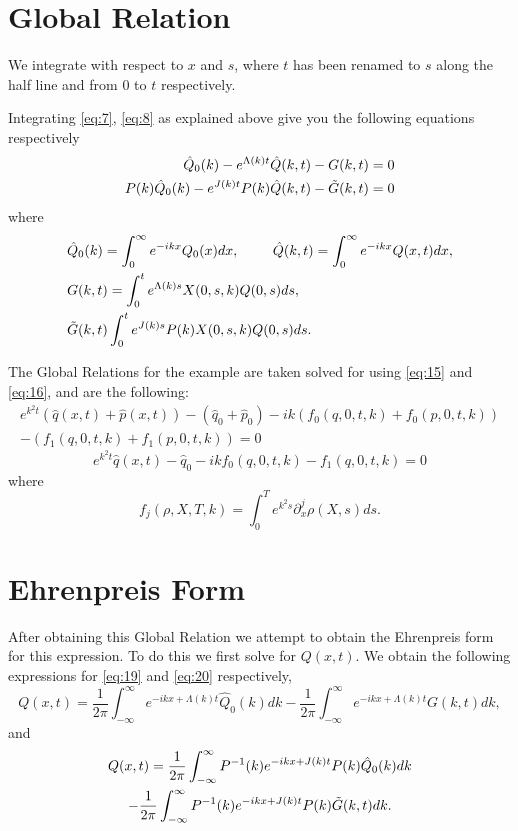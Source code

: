 \documentclass{article}
\begin{document}
\section{Global Relation}
    We integrate with respect to $x$ and $s$, where $t$ has been renamed to $s$ along the half line and from 0 to $t$ respectively.
    
    Integrating \eqref{eq:7}, \eqref{eq:8} as explained above give you the following equations respectively
    \begin{align}
        \hat{Q}_0(k) - e^{\Lambda(k)t}\hat{Q}(k,t) - G(k,t) &= 0 \label{eq:19} \\
        P(k)\hat{Q}_0(k) - e^{J(k)t}P(k)\hat{Q}(k,t) - \Tilde{G}(k,t) &= 0 \label{eq:20}
    \end{align}
where
\begin{align}
    &\hat{Q}_0(k) = \int_0^{\infty}e^{-ikx}Q_0(x)dx, 
    \hspace{2pc} \hat{Q}(k,t) = \int_0^{\infty}e^{-ikx}Q(x,t)dx, \label{eq:21}\\
    &G(k,t) = \int_0^t e^{\Lambda(k)s}X(0,s,k)Q(0,s)ds, \label{eq:22}\\ 
    &\Tilde{G}(k,t) \int_0^t e^{J(k)s}P(k)X(0,s,k)Q(0,s)ds. \label{eq:23}
\end{align}

The Global Relations for the example are taken solved for using \eqref{eq:15} and \eqref{eq:16}, and are the following:
\begin{multline} \label{eq:24}
   e^{k^2t}(\hat{q}(x,t) + \hat{p}(x,t)) - (\hat{q}_0 + \hat{p}_0) - ik(f_0(q,0,t,k) + f_0(p,0,t,k)) \\ - (f_1(q,0,t,k) + f_1(p,0,t,k)) = 0 
\end{multline}
\begin{equation} \label{eq:25}
    e^{k^2t}\hat{q}(x,t) - \hat{q}_0 - ikf_0(q,0,t,k) -f_1(q,0,t,k) = 0
\end{equation}
where
\begin{equation} \label{eq:26}
    f_j(\rho, X, T, k) = \int_0^T e^{k^2s} \partial^j_x\rho(X,s) ds. 
\end{equation}

\section{Ehrenpreis Form}
After obtaining this Global Relation we attempt to obtain the Ehrenpreis form for this expression. To do this we first solve for $Q(x,t)$. We obtain the following expressions for \eqref{eq:19} and \eqref{eq:20} respectively,
\begin{equation} \label{eq:27}
    Q(x,t) = \frac{1}{2\pi}\int_{-\infty}^{\infty}e^{-ikx+\Lambda(k)t}\hat{Q}_0(k)dk - \frac{1}{2\pi}\int_{-\infty}^{\infty}e^{-ikx+\Lambda(k)t}G(k,t)dk,
\end{equation}
and
\begin{multline}\label{eq:28}
    Q(x,t) = \frac{1}{2\pi}\int_{-\infty}^{\infty}P^{-1}(k)e^{-ikx+J(k)t}P(k)\hat{Q}_0(k)dk \\ - \frac{1}{2\pi}\int_{-\infty}^{\infty}P^{-1}(k)e^{-ikx+J(k)t}P(k)\Tilde{G}(k,t)dk.
\end{multline}
\end{document}
